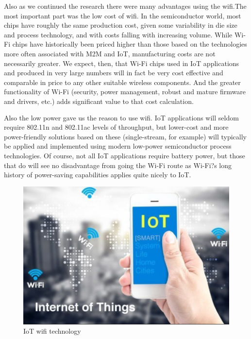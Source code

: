 \documentclass[conference]{IEEEtran}
\begin{document}
Also as we continued the research there were many advantages using the wifi.The most important part was the low cost of wifi. In the semiconductor world, most chips have roughly the same production cost, given some variability in die size and process technology, and with costs falling with increasing volume. While Wi-Fi chips have historically been priced higher than those based on the technologies more often associated with M2M and IoT, manufacturing costs are not necessarily greater. We expect, then, that Wi-Fi chips used in IoT applications and produced in very large numbers will in fact be very cost effective and comparable in price to any other suitable wireless components. And the greater functionality of Wi-Fi (security, power management, robust and mature firmware and drivers, etc.) adds significant value to that cost calculation.

Also the low power gave us the reason to use wifi. IoT applications will seldom require 802.11n and 802.11ac levels of throughput, but lower-cost and more power-friendly solutions based on these (single-stream, for example) will typically be applied and implemented using modern low-power semiconductor process technologies.  Of course, not all IoT applications require battery power, but those that do will see no disadvantage from going the Wi-Fi route as Wi-Fi?s long history of power-saving capabilities applies quite nicely to IoT.
\begin{figure}[H]
\begin{center}
    \includegraphics[scale=0.5]{wifi}
    \caption{IoT wifi technology} \label{fig:label}
\end{center}
\end{figure}
\end{document}
